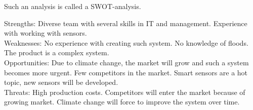 Such an analysis is called a SWOT-analysis. 

Strengths: Diverse team with several skills in IT and management. Experience with working with sensors.\\ 
Weaknesses: No experience with creating such system. No knowledge of floods. The product is a complex system.\\
Opportunities: Due to climate change, the market will grow and such a system becomes more urgent. Few competitors in the market. Smart sensors are a hot topic, new sensors will be developed.\\
Threats: High production costs. Competitors will enter the market because of growing market. Climate change will force to improve the system over time.\\

\newcommand{\SwotItems}[1]{
	\begin{itemize}
		#1
	\end{itemize}
}

\newcommand{\Strengths}{
\SwotItems{
	\item Adjustable system that is future proof
	\item Having a low selling price. Lower then the competitors
	\item Diverse team with several skills in IT and management
	\item Having a good management team
	\item Frequent discussion with technical and business experts in the field.
	\item Experience with working with sensors
}
}

\newcommand{\Weaknesses}{
\SwotItems{
	\item Decisions need to be made by the entire project team. There is a higher chance of a difference of opinion is members, holding back the project and leads to time wastes
	\item No experience with creating such system
	\item No knowledge of floods
	\item The product is a complex system
	\item Some main features rely on country-specific systems
}
}

